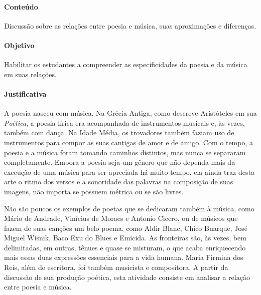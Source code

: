 \documentclass[12pt]{extarticle}
\begin{document}

\paragraph{Conteúdo} Discussão sobre as relações entre poesia e música,
suas aproximações e diferenças.

\paragraph{Objetivo} Habilitar os estudantes a compreender as
especificidades da poesia e da música em suas relações.

\paragraph{Justificativa} A poesia nasceu com música. Na Grécia Antiga,
como descreve Aristóteles em sua \emph{Poética}, a poesia lírica era
acompanhada de instrumentos musicais e, às vezes, também com dança. Na
Idade Média, os trovadores também faziam uso de instrumentos para compor
as suas cantigas de amor e de amigo. Com o tempo, a poesia e a música
foram tomando caminhos distintos, mas nunca se separaram completamente.
Embora a poesia seja um gênero que não dependa mais da execução de uma
música para ser apreciada há muito tempo, ela ainda traz desta arte o
ritmo dos versos e a sonoridade das palavras na composição de suas
imagens, não importa se possuem métrica ou se são livres.




Não são poucos os exemplos de poetas que se dedicaram também à música,
como Mário de Andrade, Vinícius de Moraes e Antonio Cicero, ou de
músicos que fazem de suas canções um belo poema, como Aldir Blanc, Chico
Buarque, José Miguel Wisnik, Baco Exu do Blues e Emicida. As fronteiras
são, às vezes, bem delimitadas, em outras, tênues e quase se misturam, o
que acaba enriquecendo mais essas duas expressões essenciais para a vida
humana. Maria Firmina dos Reis, além de escritora, foi também musicista
e compositora. A partir da discussão de sua produção poética, esta
atividade consiste em analisar a relação entre poesia e música.
\end{document}

